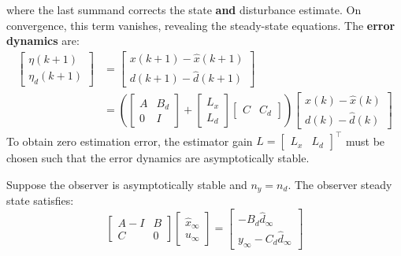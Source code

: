 where the last summand corrects the state \textbf{and} disturbance estimate. On convergence, this term vanishes, revealing the steady-state equations.
\newpar{}
The \textbf{error dynamics} are:
{\small
\begin{align*}
    \begin{bmatrix}
        \eta(k + 1) \\
        \eta_d (k+1)
    \end{bmatrix}
     & = \begin{bmatrix}
             x(k + 1) - \widehat{x}(k + 1) \\
             d(k + 1) - \widehat{d}(k + 1)
         \end{bmatrix}
    \\
     & =
    \left(
    \begin{bmatrix}
        A & B_d \\
        0 & I
    \end{bmatrix}
    +
    \begin{bmatrix}
        L_x \\
        L_d
    \end{bmatrix}
    \begin{bmatrix}
        C & C_d
    \end{bmatrix}
    \right)
    \begin{bmatrix}
        x(k) - \widehat{x}(k) \\
        d(k) - \widehat{d}(k)
    \end{bmatrix}
\end{align*}
}
\newpar{}
To obtain zero estimation error, the estimator gain $L = \begin{bmatrix} L_x & L_d \end{bmatrix}^\top$ must be chosen such that the error dynamics are asymptotically stable.

\newpar{}

Suppose the observer is asymptotically stable and $n_y = n_d$. The observer steady state satisfies:
\begin{equation*}
    \begin{bmatrix}
        A - I & B \\
        C     & 0
    \end{bmatrix}
    \begin{bmatrix}
        \widehat{x}_\infty \\
        u_\infty
    \end{bmatrix}
    =
    \begin{bmatrix}
        - B_d \widehat{d}_\infty \\
        y_\infty - C_d \widehat{d}_\infty
    \end{bmatrix}
\end{equation*}

